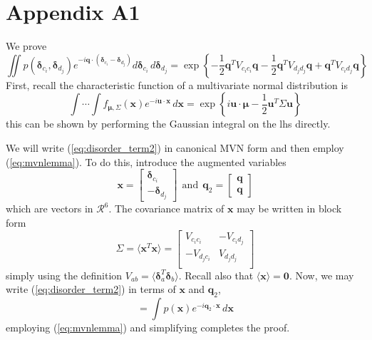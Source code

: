 \documentclass{article}
\begin{document}
\section{Appendix A1}
We prove
\begin{equation}
\iint p( \boldsymbol{\delta}_{c_i},  \boldsymbol{\delta}_{d_j} )
e^{-i \mathbf{q} \cdot ( \boldsymbol{\delta}_{c_i}  - \boldsymbol{\delta}_{d_j})} 
d \boldsymbol{\delta}_{c_i}  \, d \boldsymbol{\delta}_{d_j}
=
\exp \left\{
- \frac{1}{2} \mathbf{q}^T V_{c_i c_i} \mathbf{q}
- \frac{1}{2} \mathbf{q}^T V_{d_j d_j} \mathbf{q}
+ \mathbf{q}^T V_{c_i d_j} \mathbf{q}
\right\}
\label{eq:disorder_term2}
\end{equation}
First, recall the characteristic function of a multivariate normal distribution is
\begin{equation}
\int \cdots \int f_{\boldsymbol{\mu}, \Sigma}(\mathbf{x}) e^{-i \mathbf{u} \cdot \mathbf{x}} \, d \mathbf{x}
= \exp \left\{ i \mathbf{u} \cdot \boldsymbol{\mu} - \frac{1}{2} \mathbf{u}^T \Sigma \mathbf{u} \right\}
\label{eq:mvnlemma}
\end{equation}
this can be shown by performing the Gaussian integral on the lhs directly.

We will write (\ref{eq:disorder_term2}) in canonical MVN form and then employ (\ref{eq:mvnlemma}). To do this, introduce the augmented variables
\[
\mathbf{x} = 
\begin{bmatrix}
\boldsymbol{\delta}_{c_i} \\
- \boldsymbol{\delta}_{d_j}
\end{bmatrix}
%
\ \ \mathrm{and} \ \
%
\mathbf{q}_2 = 
\begin{bmatrix}
\mathbf{q} \\
\mathbf{q}
\end{bmatrix}
\]
which are vectors in $\mathcal{R}^6$. The covariance matrix of $\mathbf{x}$ may be written in block form
\[
\Sigma = 
\langle \mathbf{x}^T  \mathbf{x} \rangle = 
\begin{bmatrix}
V_{{c_i}{c_i}} & -V_{{c_i}{d_j}} \\
-V_{{d_j}{c_i}} & V_{{d_j}{d_j}} \\
\end{bmatrix}
\]
simply using the definition $V_{ab} = \langle \boldsymbol{\delta}_{a}^T\boldsymbol{\delta}_{b} \rangle$. Recall also that $\langle \mathbf{x} \rangle = \mathbf{0}$. Now, we may write (\ref{eq:disorder_term2}) in terms of $\mathbf{x}$ and $\mathbf{q}_2$,
\[
= \int p(\mathbf{x} ) e^{- i \mathbf{q}_2 \cdot \mathbf{x} } \, d \mathbf{x}
\]
employing (\ref{eq:mvnlemma}) and simplifying completes the proof.


\end{document}

